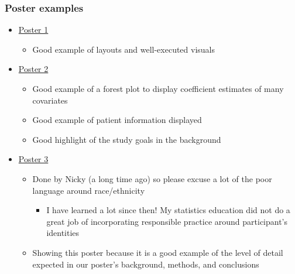 \documentclass[
  letterpaper,
  DIV=11,
  numbers=noendperiod]{scrartcl}
\providecommand{\tightlist}{%
  \setlength{\itemsep}{0pt}\setlength{\parskip}{0pt}}\usepackage{longtable,booktabs,array}
\begin{document}
\subsubsection{Poster examples}\label{poster-examples}

\begin{itemize}
\tightlist
\item
  \href{https://ohsuitg-my.sharepoint.com/:b:/r/personal/wakim_ohsu_edu/Documents/Teaching/Classes/W25_BSTA_512_612/Student_files/Project/Sample_poster/McVeety_Trans_Single_Payer_Poster.pdf?csf=1&web=1&e=PsN3TI}{Poster
  1}

  \begin{itemize}
  \tightlist
  \item
    Good example of layouts and well-executed visuals
  \end{itemize}
\item
  \href{https://ohsuitg-my.sharepoint.com/:b:/r/personal/wakim_ohsu_edu/Documents/Teaching/Classes/W25_BSTA_512_612/Student_files/Project/Sample_poster/Analysis\%20of\%20Veterans\%27\%20Non-disclosure\%20of\%20Suicidal\%20Thoughts.pdf?csf=1&web=1&e=z7V8cv}{Poster
  2}

  \begin{itemize}
  \tightlist
  \item
    Good example of a forest plot to display coefficient estimates of
    many covariates
  \item
    Good example of patient information displayed
  \item
    Good highlight of the study goals in the background
  \end{itemize}
\item
  \href{https://ohsuitg-my.sharepoint.com/:b:/r/personal/wakim_ohsu_edu/Documents/Teaching/Classes/W25_BSTA_512_612/Student_files/Project/Sample_poster/nwakim_prop_score.pdf?csf=1&web=1&e=xefr7T}{Poster
  3}

  \begin{itemize}
  \tightlist
  \item
    Done by Nicky (a long time ago) so please excuse a lot of the poor
    language around race/ethnicity

    \begin{itemize}
    \tightlist
    \item
      I have learned a lot since then! My statistics education did not
      do a great job of incorporating responsible practice around
      participant's identities
    \end{itemize}
  \item
    Showing this poster because it is a good example of the level of
    detail expected in our poster's background, methods, and conclusions
  \end{itemize}
\end{itemize}
\end{document}
